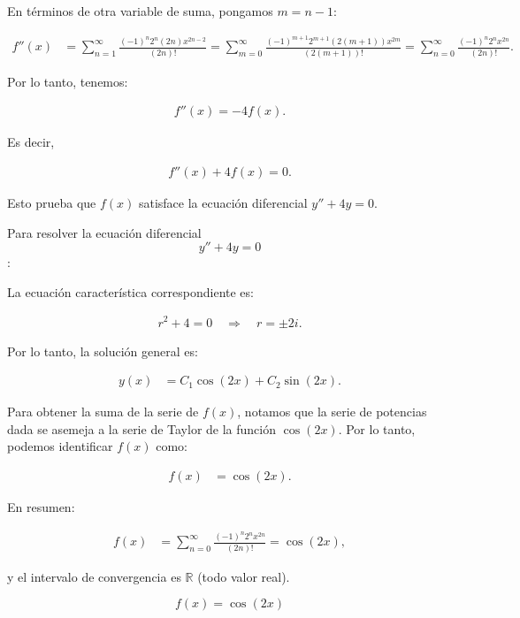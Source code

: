 \documentclass{article}
\begin{document}
    En términos de otra variable de suma, pongamos $m=n-1$:

    \begin{align*}
    f''(x) &= \sum_{n=1}^{\infty} \frac{(-1)^{n} 2^{n} (2n) x^{2n-2}}{(2 n)!}
    = \sum_{m=0}^{\infty} \frac{(-1)^{m+1} 2^{m+1} (2(m+1)) x^{2m}}{(2(m+1))!}
    = \sum_{n=0}^{\infty} \frac{(-1)^{n} 2^{n} x^{2 n}}{(2 n)!}.
    \end{align*}

    Por lo tanto, tenemos:

    \begin{align*}
    f''(x) = -4 f(x).
    \end{align*}

    Es decir,

    \begin{align*}
    f''(x) + 4 f(x) = 0.
    \end{align*}

    Esto prueba que \( f(x) \) satisface la ecuación diferencial \( y'' + 4y = 0\).

    Para resolver la ecuación diferencial \[ y'' + 4y = 0 \]:

    La ecuación característica correspondiente es:

    \begin{align*}
    r^2 + 4 = 0 \quad \Rightarrow \quad r = \pm 2i.
    \end{align*}

    Por lo tanto, la solución general es:

    \begin{align*}
    y(x) &= C_1 \cos(2x) + C_2 \sin(2x).
    \end{align*}

    Para obtener la suma de la serie de $f(x)$, notamos que la serie de potencias dada se asemeja a la serie de Taylor de la función $\cos(2x)$. Por lo tanto, podemos identificar $f(x)$ como:

    \begin{align*}
    f(x) &= \cos(2x).
    \end{align*}

    En resumen:

    \begin{align*}
    f(x) &= \sum_{n=0}^{\infty} \frac{(-1)^{n} 2^{n} x^{2 n}}{(2 n)!} = \cos(2x),
    \end{align*}

    y el intervalo de convergencia es $\mathbb{R}$ (todo valor real).

    \[
    f(x) = \cos(2x)
    \]
\end{document}
